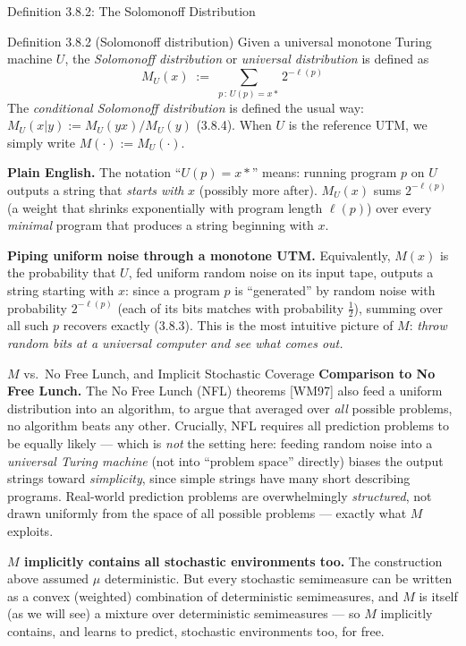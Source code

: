 \documentclass[aspectratio=169,10pt]{beamer}
\begin{document}
\begin{frame}{Definition 3.8.2: The Solomonoff Distribution}
  \begin{block}{Definition 3.8.2 (Solomonoff distribution)}
    Given a universal monotone Turing machine $U$, the \emph{Solomonoff
    distribution} or \emph{universal distribution} is defined as
    \[
      M_U(x) \; := \; \sum_{p\,:\,U(p)=x*} 2^{-\ell(p)} \tag{3.8.3}
    \]
    The \emph{conditional Solomonoff distribution} is defined the usual way:
    $M_U(x|y) := M_U(yx)/M_U(y)$ (3.8.4). When $U$ is the reference UTM, we
    simply write $M(\cdot):=M_U(\cdot)$.
  \end{block}
  \textbf{Plain English.} The notation ``$U(p)=x*$'' means: running program
  $p$ on $U$ outputs a string that \emph{starts with} $x$ (possibly more
  after). $M_U(x)$ sums $2^{-\ell(p)}$ (a weight that shrinks exponentially
  with program length $\ell(p)$) over every \emph{minimal} program that
  produces a string beginning with $x$.

  \vspace{2mm}
  \textbf{Piping uniform noise through a monotone UTM.} Equivalently, $M(x)$
  is the probability that $U$, fed uniform random noise on its input tape,
  outputs a string starting with $x$: since a program $p$ is ``generated''
  by random noise with probability $2^{-\ell(p)}$ (each of its bits matches
  with probability $\tfrac12$), summing over all such $p$ recovers exactly
  (3.8.3). This is the most intuitive picture of $M$: \emph{throw random bits
  at a universal computer and see what comes out.}
\end{frame}

\begin{frame}{$M$ vs.\ No Free Lunch, and Implicit Stochastic Coverage}
  \textbf{Comparison to No Free Lunch.} The No Free Lunch (NFL) theorems
  [WM97] also feed a uniform distribution into an algorithm, to argue that
  averaged over \emph{all} possible problems, no algorithm beats any other.
  Crucially, NFL requires all prediction problems to be equally likely ---
  which is \emph{not} the setting here: feeding random noise into a
  \emph{universal Turing machine} (not into ``problem space'' directly)
  biases the output strings toward \emph{simplicity}, since simple strings
  have many short describing programs. Real-world prediction problems are
  overwhelmingly \emph{structured}, not drawn uniformly from the space of
  all possible problems --- exactly what $M$ exploits.

  \vspace{2mm}
  \textbf{$M$ implicitly contains all stochastic environments too.} The
  construction above assumed $\mu$ deterministic. But every stochastic
  semimeasure can be written as a convex (weighted) combination of
  deterministic semimeasures, and $M$ is itself (as we will see) a mixture
  over deterministic semimeasures --- so $M$ implicitly contains, and learns
  to predict, stochastic environments too, for free.
\end{frame}
\end{document}
